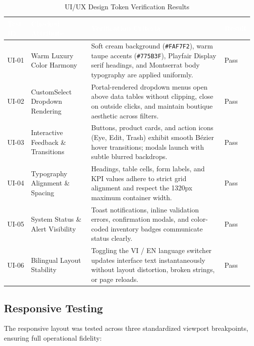 \documentclass[12pt,a4paper,oneside]{report}
\begin{document}
\begin{table}[H]
\centering
\small
\begin{tabular}{|p{1.4cm}|p{3.8cm}|p{8.4cm}|p{1.3cm}|}
\hline
\rowcolor{PrimaryBrown}
\textcolor{white}{\textbf{Test ID}} & \textcolor{white}{\textbf{Checked Attribute}} & \textcolor{white}{\textbf{Verification Criteria}} & \textcolor{white}{\textbf{Result}} \\
\hline
UI-01 & Warm Luxury Color Harmony & Soft cream background (\texttt{\#FAF7F2}), warm taupe accents (\texttt{\#775B3F}), Playfair Display serif headings, and Montserrat body typography are applied uniformly. & Pass \\
\hline
UI-02 & CustomSelect Dropdown Rendering & Portal-rendered dropdown menus open above data tables without clipping, close on outside clicks, and maintain boutique aesthetic across filters. & Pass \\
\hline
UI-03 & Interactive Feedback \& Transitions & Buttons, product cards, and action icons (Eye, Edit, Trash) exhibit smooth B\'{e}zier hover transitions; modals launch with subtle blurred backdrops. & Pass \\
\hline
UI-04 & Typography Alignment \& Spacing & Headings, table cells, form labels, and KPI values adhere to strict grid alignment and respect the 1320px maximum container width. & Pass \\
\hline
UI-05 & System Status \& Alert Visibility & Toast notifications, inline validation errors, confirmation modals, and color-coded inventory badges communicate status clearly. & Pass \\
\hline
UI-06 & Bilingual Layout Stability & Toggling the VI / EN language switcher updates interface text instantaneously without layout distortion, broken strings, or page reloads. & Pass \\
\hline
\end{tabular}
\caption{UI/UX Design Token Verification Results}
\end{table}

\subsection{Responsive Testing}
The responsive layout was tested across three standardized viewport breakpoints, ensuring full operational fidelity:
\end{document}
